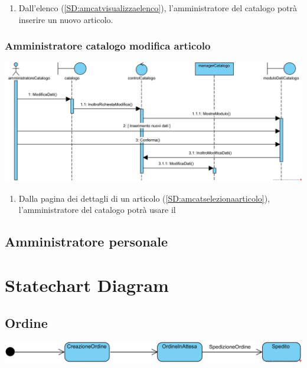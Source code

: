 \documentclass[12pt,a4paper]{article}
\begin{document}
\begin{enumerate}
\item Dall'elenco (\ref{SD:amcatvisualizzaelenco}), l'amministratore del catalogo potrà inserire un nuovo articolo.
\end{enumerate}

\subsubsection{Amministratore catalogo modifica articolo}
\label{SD:amcatmodificaarticolo}
\begin{center}
\includegraphics[width=\textwidth]{SequenceDiagram/AmministratoreCatalogoModificaArticolo}
\end{center}

\begin{enumerate}
\item Dalla pagina dei dettagli di un articolo (\ref{SD:amcatselezionaarticolo}), l'amministratore del catalogo potrà usare il 
\end{enumerate}


\subsection{Amministratore personale}


\section{Statechart Diagram}

\subsection{Ordine}
\includegraphics[width=\textwidth]{StateChart/Ordine}
\end{document}
